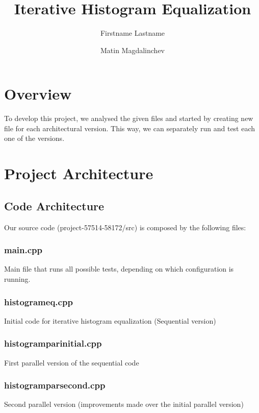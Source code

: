 \documentclass[sigconf]{acmart}
\begin{document}
\title{Iterative Histogram Equalization}

\author{Firstname Lastname}

\author{Matin Magdalinchev}

\maketitle

\section{Overview}
To develop this project, we analysed the given files and started by creating new file for each architectural version. This way, we can separately run and test each one of the versions. 
\section{Project Architecture}

\subsection{Code Architecture}
Our source code (project-57514-58172/src) is composed by the following files:

\subsubsection{main.cpp}
Main file that runs all possible tests, depending on which configuration is running.

\subsubsection{histogram\textunderscore eq.cpp}
Initial code for iterative histogram equalization (Sequential version)

\subsubsection{histogram\textunderscore par\textunderscore initial.cpp}
First parallel version of the sequential code

\subsubsection{histogram\textunderscore par\textunderscore second.cpp}
Second parallel version (improvements made over the initial parallel version)
\end{document}
